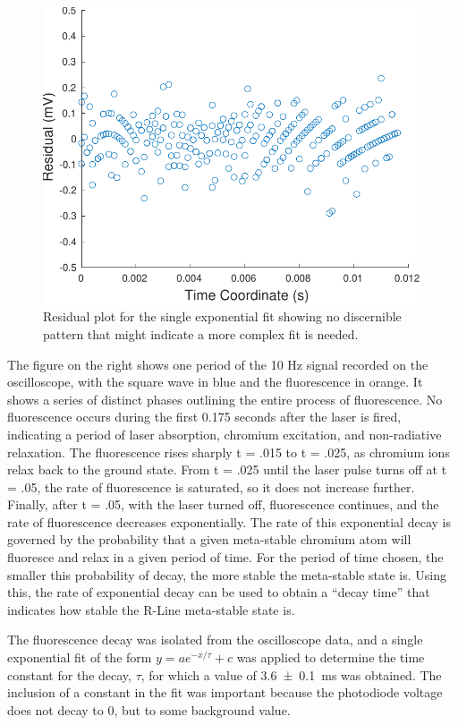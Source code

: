 \documentclass[11pt, a4paper, twocolumn]{article}
\begin{document}
\begin{figure}[H]
\includegraphics[width=\linewidth]{decayResiduals.pdf}
\caption{Residual plot for the single exponential fit showing no discernible pattern that might indicate a more complex fit is needed.}
\label{fig:intensities}
\end{figure}

The figure on the right shows one period of the 10 Hz signal recorded on the oscilloscope, with the square wave in blue and the fluorescence in orange. It shows a series of distinct phases outlining the entire process of fluorescence. No fluorescence occurs during the first 0.175 seconds after the laser is fired, indicating a period of laser absorption, chromium excitation, and non-radiative relaxation. The fluorescence rises sharply t = .015 to t = .025, as chromium ions relax back to the ground state. From t = .025 until the laser pulse turns off at t = .05, the rate of fluorescence is saturated, so it does not increase further. Finally, after t = .05, with the laser turned off, fluorescence continues, and the rate of fluorescence decreases exponentially. 
The rate of this exponential decay is governed by the probability that a given meta-stable chromium atom will fluoresce and relax in a given period of time. For the period of time chosen, the smaller this probability of decay, the more stable the meta-stable state is. Using this, the rate of exponential decay can be used to obtain a “decay time” that indicates how stable the R-Line meta-stable state is.

The fluorescence decay was isolated from the oscilloscope data, and a single exponential fit of the form $y = ae^{-x/\tau} + c$ was applied to determine the time constant for the decay, $\tau$, for which a value of \SI{3.6\pm0.1}{\ms} was obtained. The inclusion of a constant in the fit was important because the photodiode voltage does not decay to 0, but to some background value.
\end{document}
